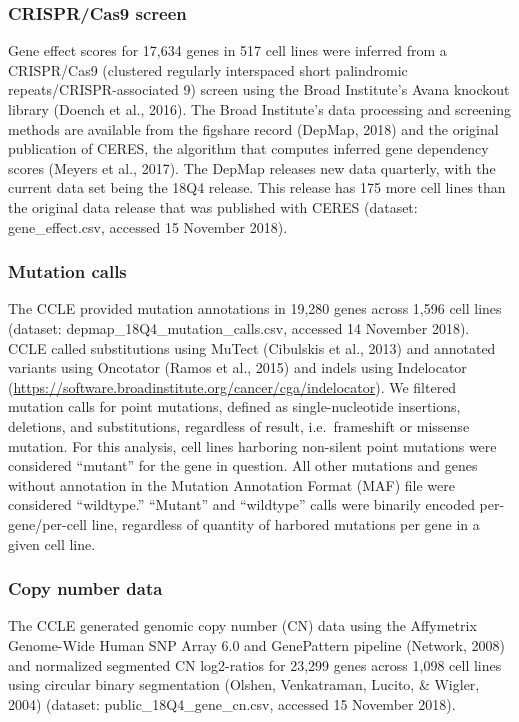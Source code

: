 \documentclass[man]{apa6}
\begin{document}
\subsubsection{CRISPR/Cas9 screen}\label{crisprcas9-screen}

Gene effect scores for 17,634 genes in 517 cell lines were inferred from
a CRISPR/Cas9 (clustered regularly interspaced short palindromic
repeats/CRISPR-associated 9) screen using the Broad Institute's Avana
knockout library (Doench et al., 2016). The Broad Institute's data
processing and screening methods are available from the figshare record
(DepMap, 2018) and the original publication of CERES, the algorithm that
computes inferred gene dependency scores (Meyers et al., 2017). The
DepMap releases new data quarterly, with the current data set being the
18Q4 release. This release has 175 more cell lines than the original
data release that was published with CERES (dataset: gene\_effect.csv,
accessed 15 November 2018).

\subsubsection{Mutation calls}\label{mutation-calls}

The CCLE provided mutation annotations in 19,280 genes across 1,596 cell
lines (dataset: depmap\_18Q4\_mutation\_calls.csv, accessed 14 November
2018). CCLE called substitutions using MuTect (Cibulskis et al., 2013)
and annotated variants using Oncotator (Ramos et al., 2015) and indels
using Indelocator
(\url{https://software.broadinstitute.org/cancer/cga/indelocator}). We
filtered mutation calls for point mutations, defined as
single-nucleotide insertions, deletions, and substitutions, regardless
of result, i.e.~frameshift or missense mutation. For this analysis, cell
lines harboring non-silent point mutations were considered
\enquote{mutant} for the gene in question. All other mutations and genes
without annotation in the Mutation Annotation Format (MAF) file were
considered \enquote{wildtype.} \enquote{Mutant} and \enquote{wildtype}
calls were binarily encoded per-gene/per-cell line, regardless of
quantity of harbored mutations per gene in a given cell line.

\subsubsection{Copy number data}\label{copy-number-data}

The CCLE generated genomic copy number (CN) data using the Affymetrix
Genome-Wide Human SNP Array 6.0 and GenePattern pipeline (Network, 2008)
and normalized segmented CN log2-ratios for 23,299 genes across 1,098
cell lines using circular binary segmentation (Olshen, Venkatraman,
Lucito, \& Wigler, 2004) (dataset: public\_18Q4\_gene\_cn.csv, accessed
15 November 2018).
\end{document}
